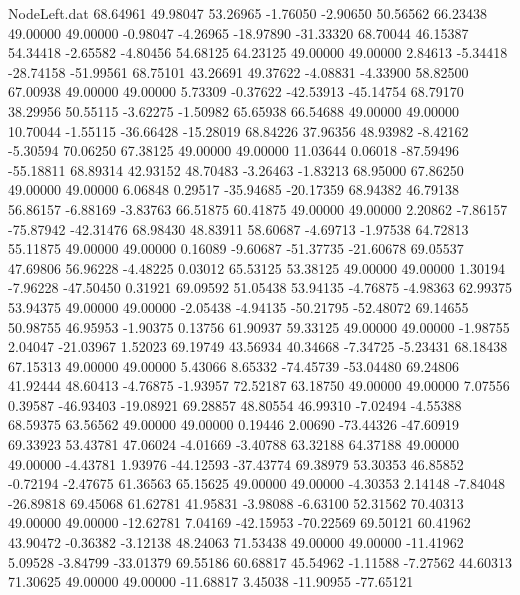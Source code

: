 \begin{filecontents}{NodeLeft.dat}
  68.64961   49.98047   53.26965    -1.76050   -2.90650   50.56562   66.23438   49.00000   49.00000   -0.98047   -4.26965  -18.97890  -31.33320
  68.70044   46.15387   54.34418    -2.65582   -4.80456   54.68125   64.23125   49.00000   49.00000    2.84613   -5.34418  -28.74158  -51.99561
  68.75101   43.26691   49.37622    -4.08831   -4.33900   58.82500   67.00938   49.00000   49.00000    5.73309   -0.37622  -42.53913  -45.14754
  68.79170   38.29956   50.55115    -3.62275   -1.50982   65.65938   66.54688   49.00000   49.00000   10.70044   -1.55115  -36.66428  -15.28019
  68.84226   37.96356   48.93982    -8.42162   -5.30594   70.06250   67.38125   49.00000   49.00000   11.03644    0.06018  -87.59496  -55.18811
  68.89314   42.93152   48.70483    -3.26463   -1.83213   68.95000   67.86250   49.00000   49.00000    6.06848    0.29517  -35.94685  -20.17359
  68.94382   46.79138   56.86157    -6.88169   -3.83763   66.51875   60.41875   49.00000   49.00000    2.20862   -7.86157  -75.87942  -42.31476
  68.98430   48.83911   58.60687    -4.69713   -1.97538   64.72813   55.11875   49.00000   49.00000    0.16089   -9.60687  -51.37735  -21.60678
  69.05537   47.69806   56.96228    -4.48225    0.03012   65.53125   53.38125   49.00000   49.00000    1.30194   -7.96228  -47.50450    0.31921
  69.09592   51.05438   53.94135    -4.76875   -4.98363   62.99375   53.94375   49.00000   49.00000   -2.05438   -4.94135  -50.21795  -52.48072
  69.14655   50.98755   46.95953    -1.90375    0.13756   61.90937   59.33125   49.00000   49.00000   -1.98755    2.04047  -21.03967    1.52023
  69.19749   43.56934   40.34668    -7.34725   -5.23431   68.18438   67.15313   49.00000   49.00000    5.43066    8.65332  -74.45739  -53.04480
  69.24806   41.92444   48.60413    -4.76875   -1.93957   72.52187   63.18750   49.00000   49.00000    7.07556    0.39587  -46.93403  -19.08921
  69.28857   48.80554   46.99310    -7.02494   -4.55388   68.59375   63.56562   49.00000   49.00000    0.19446    2.00690  -73.44326  -47.60919
  69.33923   53.43781   47.06024    -4.01669   -3.40788   63.32188   64.37188   49.00000   49.00000   -4.43781    1.93976  -44.12593  -37.43774
  69.38979   53.30353   46.85852    -0.72194   -2.47675   61.36563   65.15625   49.00000   49.00000   -4.30353    2.14148   -7.84048  -26.89818
  69.45068   61.62781   41.95831    -3.98088   -6.63100   52.31562   70.40313   49.00000   49.00000  -12.62781    7.04169  -42.15953  -70.22569
  69.50121   60.41962   43.90472    -0.36382   -3.12138   48.24063   71.53438   49.00000   49.00000  -11.41962    5.09528   -3.84799  -33.01379
  69.55186   60.68817   45.54962    -1.11588   -7.27562   44.60313   71.30625   49.00000   49.00000  -11.68817    3.45038  -11.90955  -77.65121

\end{filecontents}
